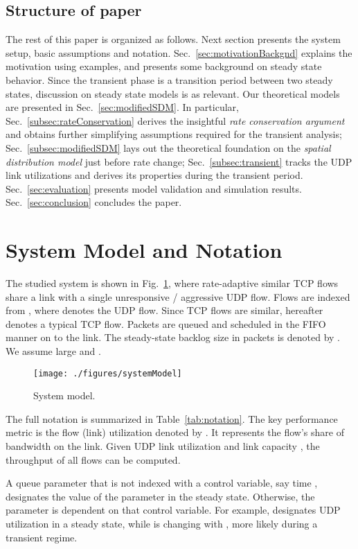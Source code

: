 \documentclass{IEEEtran}
\begin{document}
    \subsection{Structure of paper}
    The rest of this paper is organized as follows. Next section presents the system setup, basic assumptions and notation. Sec.~\ref{sec:motivationBackgnd} explains the motivation using examples, and presents some background on steady state behavior. Since the transient phase is a transition period between two steady states, discussion on steady state models is as relevant. Our theoretical models are presented in Sec.~\ref{sec:modifiedSDM}. In particular, Sec.~\ref{subsec:rateConservation} derives the insightful \emph{rate conservation argument} and obtains  further simplifying assumptions required for the transient analysis; Sec.~\ref{subsec:modifiedSDM} lays out the theoretical foundation on the \emph{spatial distribution model} just before rate change; Sec.~\ref{subsec:transient} tracks the UDP link utilizations and derives its properties during the transient period. Sec.~\ref{sec:evaluation} presents model validation and simulation results. Sec.~\ref{sec:conclusion} concludes the paper.

\section{System Model and Notation} \label{sec:modelAssumptionNotation}
    The studied system is shown in Fig.~\ref{fig:sysModel}, where  rate-adaptive similar TCP flows share a link with a single unresponsive / aggressive UDP flow. Flows are indexed from , where  denotes the UDP flow. Since TCP flows are similar, hereafter  denotes a typical TCP flow. Packets are queued and scheduled in the FIFO manner on to the link. The steady-state backlog size in packets is denoted by .  We assume large  and .
        \begin{figure}[h]
            \centering
            \texttt{[image: ./figures/systemModel]}\caption{System model.}
            \label{fig:sysModel}
        \end{figure}

 The full notation is summarized in Table~\ref{tab:notation}. The key performance metric is the flow (link) utilization denoted by . It represents the flow's share of bandwidth on the link. Given UDP link utilization  and link capacity ,  the throughput of all flows  can be computed.

 A queue parameter that is not indexed with a control variable, say time , designates the value of the parameter in the steady state. Otherwise, the parameter is dependent on that control variable. For example,  designates UDP utilization in a steady state, while  is changing with , more likely during a transient regime.
\end{document}
